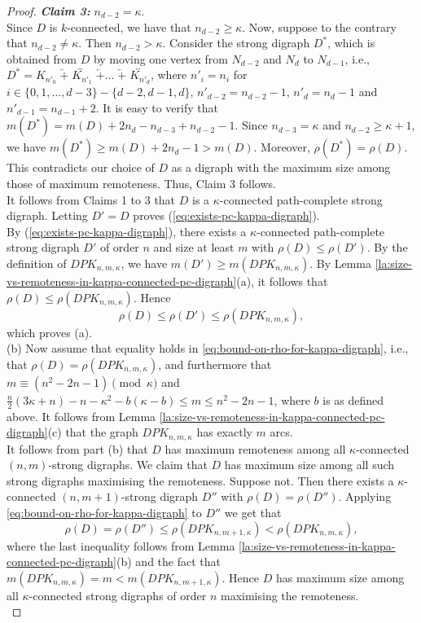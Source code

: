 \documentclass[a4paper,11pt]{article}
\begin{document}
\begin{proof}
\emph{{\bf Claim 3:}} $ n_{d-2} = \kappa $. \\

Since $D$ is $k$-connected, we have that $n_{d-2} \geq \kappa$. Now, suppose to the contrary that \( n_{d-2} \neq \kappa \). Then \( n_{d-2} > \kappa \). Consider the strong digraph \( D^* \), which is obtained from \( D \) by moving one vertex from \( N_{d-2} \) and \( N_d \) to \( N_{d-1} \), i.e., $D^*=K_{n'_0} \; \overleftarrow{+} \; \overleftrightarrow{K_{n'_1}} \; \overleftarrow{+} \ldots \; \overleftarrow{+} \; \overleftrightarrow{K_{n'_d}}$, where
$n'_i=n_i$ for $i \in \{0,1,\ldots,d-3\} - \{d-2,d-1,d\}$,  
$n'_{d-2}=n_{d-2}-1$, $n'_{d}=n_{d}-1$ and $n'_{d-1}= n_{d-1}+2$. It is easy to verify that $m(D^*) = m(D) + 2n_d - n_{d-3} + n_{d-2} - 1$. Since \( n_{d-3} = \kappa \) and \( n_{d-2} \geq \kappa+1 \), we have $
m(D^*) \geq m(D) + 2n_d-1 > m(D).
$ Moreover, \( \rho(D^*) = \rho(D) \). This contradicts our choice of $D$ as a digraph with the maximum size among those of maximum remoteness. Thus, Claim 3 follows.  \\



\noindent It follows from Claims 1 to 3 that $D$ is a $\kappa$-connected path-complete strong digraph. Letting $D'=D$ proves (\ref{eq:exists-pc-kappa-digraph}).  \\

By (\ref{eq:exists-pc-kappa-digraph}), there exists a $\kappa$-connected path-complete strong digraph $D'$ of order $n$ and size at least $m$ with $\rho(D) \leq \rho(D')$. By the definition of $DPK_{n,m,\kappa}$, we have $m(D') \geq m(DPK_{n,m,\kappa})$.  By Lemma \ref{la:size-vs-remoteness-in-kappa-connected-pc-digraph}(a), it follows that $\rho(D) \leq \rho(DPK_{n,m,\kappa}) $. Hence 
\[\rho(D) \leq \rho(D') \leq \rho(DPK_{n,m,\kappa}),\]
which proves (a). \\

(b) Now assume that equality holds in \eqref{eq:bound-on-rho-for-kappa-digraph}, i.e., that
$\rho(D) = \rho(DPK_{n,m,\kappa})$, and furthermore that $m \equiv (n^2-2n-1) \pmod{\kappa} $ and $ \frac{n}{2}(3\kappa+n)-n-\kappa^2-b(\kappa-b) \leq m \leq n^2-2n-1$, where $b$ is as defined above. 
It follows from Lemma \ref{la:size-vs-remoteness-in-kappa-connected-pc-digraph}(c) that the 
graph $DPK_{n,m,\kappa}$ has exactly $m$ arcs. \\

It follows from part (b) that $D$ has maximum remoteness among all $\kappa$-connected 
$(n,m)$-strong digraphs. We claim that $D$ has maximum size among all such strong digraphs 
maximising the remoteness. Suppose not. Then there exists a $\kappa$-connected 
$(n,m+1)$-strong digraph $D''$ with $\rho(D) = \rho(D'')$. Applying \eqref{eq:bound-on-rho-for-kappa-digraph} to $D''$ we get that
\[ \rho(D) = \rho(D'') \leq \rho(DPK_{n,m+1,\kappa}) < \rho(DPK_{n,m,\kappa}), \]
where the last inequality follows from 
Lemma \ref{la:size-vs-remoteness-in-kappa-connected-pc-digraph}(b) and the fact that 
$m(DPK_{n,m,\kappa})= m < m(DPK_{n,m+1,\kappa})$. Hence $D$ has maximum size among all $\kappa$-connected strong digraphs of order $n$ maximising the remoteness. \\


\end{proof}
\end{document}

